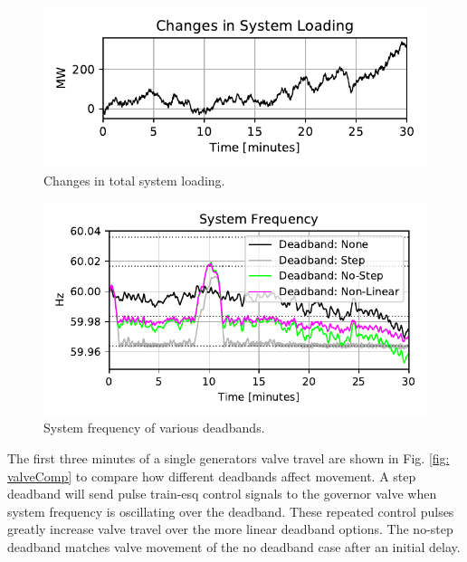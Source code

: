\begin{figure}[!ht]
\centering
\includegraphics[width=\linewidth]{figures/miniWECCuniAccPloadChange}
\caption{Changes in total system loading.}
\label{fig: systemLoading}
\end{figure}

\begin{figure}[!ht]
\centering
\includegraphics[width=\linewidth]{figures/miniWECCnoiseNLdroopDBFreq}
\caption{System frequency of various deadbands.}
\label{fig: sysFreqDB}
\end{figure}

The first three minutes of a single generators valve travel are shown in Fig. \ref{fig: valveComp} to compare how different deadbands affect movement.
A step deadband will send pulse train-esq control signals to the governor valve when system frequency is oscillating over the deadband. 
These repeated control pulses greatly increase valve travel over the more linear deadband options.
The no-step deadband matches valve movement of the no deadband case after an initial delay.

